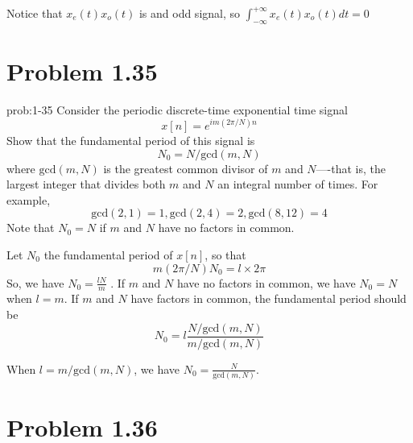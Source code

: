 \documentclass[koma,a4paper,utopia,12pt,listings-color,microtype,paralist,colorlinks,urlcolor=red]{org-article}
\begin{document}
Notice that \(x_{e}(t)x_{o}(t)\) is and odd signal, so \(\int_{-\infty}^{+\infty} x_{e}(t)x_{o}(t) dt = 0\)
\section{Problem 1.35}
\label{sec:org1baca05}


\begin{prob}[]{prob:1-35}
Consider the periodic discrete-time exponential time signal
\begin{equation*}
x[n] = e^{im(2\pi/N)n}
\end{equation*}
Show that the fundamental period of this signal is
\begin{equation*}
N_{0} = N / \mathrm{gcd}(m,N)
\end{equation*}
where \(\mathrm{gcd}(m,N)\) is the greatest common divisor of \(m\) and
\(N\)----that is, the largest integer that divides both \(m\) and \(N\) an
integral number of times. For example,
\begin{equation*}
\mathrm{gcd}(2,1) = 1, \mathrm{gcd}(2,4) = 2, \mathrm{gcd}(8,12) = 4
\end{equation*}
Note that \(N_{0} = N\) if \(m\) and \(N\) have no factors in common.
\label{prob:1-35}
\end{prob}

\begin{prf}[]{}
Let \(N_{0}\) the fundamental period of \(x[n]\), so that
\begin{equation*}
m(2\pi / N) N_{0} = l\times 2\pi
\end{equation*}
So, we have \(N_{0} = \frac{lN}{m}\) . If \(m\) and \(N\) have no factors in
common, we have \(N_{0} = N\) when \(l = m\). If \(m\) and \(N\) have factors in
common, the fundamental period should be
\begin{equation*}
N_{0} = l \frac{N/ \mathrm{gcd}(m,N) }{m/ \mathrm{gcd}(m,N)}
\end{equation*}

When \(l = m/ \mathrm{gcd}(m,N)\), we have \(N_{0} = \frac{N}{ \mathrm{gcd}(m,N) }\).
\end{prf}
\section{Problem 1.36}
\label{sec:org2d12240}
\end{document}
